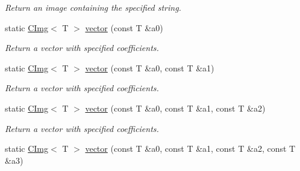 \begin{DoxyCompactItemize}
\begin{DoxyCompactList}\small\item\em Return an image containing the specified string. \item\end{DoxyCompactList}\item 
\hypertarget{structcimg__library_1_1CImg_ac2f7bb966ea88b768fdca82d82a96ba0}{
static \hyperlink{structcimg__library_1_1CImg}{CImg}$<$ T $>$ \hyperlink{structcimg__library_1_1CImg_ac2f7bb966ea88b768fdca82d82a96ba0}{vector} (const T \&a0)}
\label{structcimg__library_1_1CImg_ac2f7bb966ea88b768fdca82d82a96ba0}

\begin{DoxyCompactList}\small\item\em Return a vector with specified coefficients. \item\end{DoxyCompactList}\item 
\hypertarget{structcimg__library_1_1CImg_a4018dc62ea62f2ede589cfd01168d103}{
static \hyperlink{structcimg__library_1_1CImg}{CImg}$<$ T $>$ \hyperlink{structcimg__library_1_1CImg_a4018dc62ea62f2ede589cfd01168d103}{vector} (const T \&a0, const T \&a1)}
\label{structcimg__library_1_1CImg_a4018dc62ea62f2ede589cfd01168d103}

\begin{DoxyCompactList}\small\item\em Return a vector with specified coefficients. \item\end{DoxyCompactList}\item 
\hypertarget{structcimg__library_1_1CImg_a6660d13478b094af5f46eb1fbc110513}{
static \hyperlink{structcimg__library_1_1CImg}{CImg}$<$ T $>$ \hyperlink{structcimg__library_1_1CImg_a6660d13478b094af5f46eb1fbc110513}{vector} (const T \&a0, const T \&a1, const T \&a2)}
\label{structcimg__library_1_1CImg_a6660d13478b094af5f46eb1fbc110513}

\begin{DoxyCompactList}\small\item\em Return a vector with specified coefficients. \item\end{DoxyCompactList}\item 
\hypertarget{structcimg__library_1_1CImg_a064afd0c0df3a55acb3f47c208044d7a}{
static \hyperlink{structcimg__library_1_1CImg}{CImg}$<$ T $>$ \hyperlink{structcimg__library_1_1CImg_a064afd0c0df3a55acb3f47c208044d7a}{vector} (const T \&a0, const T \&a1, const T \&a2, const T \&a3)}
\label{structcimg__library_1_1CImg_a064afd0c0df3a55acb3f47c208044d7a}


\end{DoxyCompactItemize}
